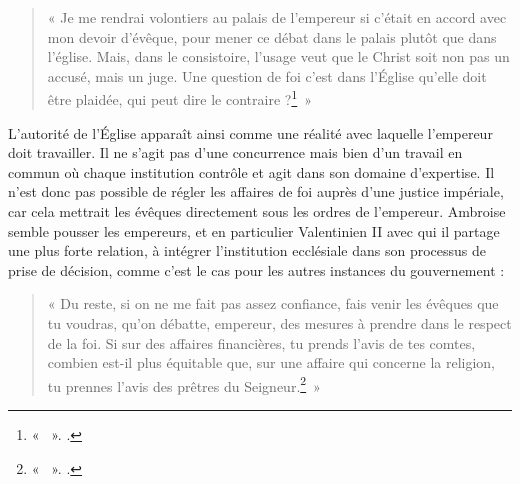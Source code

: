 \bigskip

\begin{quote}
    « Je me rendrai volontiers au palais de l’empereur si c’était en accord avec mon devoir d’évêque, pour mener ce débat dans le palais plutôt que dans l’église. Mais, dans le consistoire, l’usage veut que le Christ soit non pas un accusé, mais un juge. Une question de foi c’est dans l’Église qu’elle doit être plaidée, qui peut dire le contraire ?\footnote{« ~». \cite[\nopp 75A,3]{ambroise_lettres}.}~»
\end{quote}

\bigskip

L’autorité de l’Église apparaît ainsi comme une réalité avec laquelle l’empereur doit travailler. Il ne s’agit pas d’une concurrence mais bien d’un travail en commun où chaque institution contrôle et agit dans son domaine d’expertise. Il n’est donc pas possible de régler les affaires de foi auprès d’une justice impériale, car cela mettrait les évêques directement sous les ordres de l’empereur. Ambroise semble pousser les empereurs, et en particulier Valentinien II avec qui il partage une plus forte relation, à intégrer l’institution ecclésiale dans son processus de prise de décision, comme c’est le cas pour les autres instances du gouvernement :

\bigskip

\begin{quote}
    « Du reste, si on ne me fait pas assez confiance, fais venir les évêques que tu voudras, qu’on débatte, empereur, des mesures à prendre dans le respect de la foi. Si sur des affaires financières, tu prends l’avis de tes comtes, combien est-il plus équitable que, sur une affaire qui concerne la religion, tu prennes l’avis des prêtres du Seigneur.\footnote{« ~». \cite[,27]{ambroise_lettres}.}~»
\end{quote}

\bigskip

